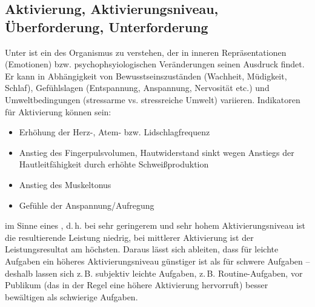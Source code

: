 \subsection{Aktivierung, Aktivierungsniveau, Überforderung, Unterforderung}

\label{topic:ueberforderung-psi}
\label{topic:unterforderung-psi}



Unter  ist ein  des Organismus zu verstehen, der in
inneren Repräsentationen (Emotionen) bzw.
psychophsyiologischen Veränderungen seinen Ausdruck findet.
Er kann in Abhängigkeit von Bewusstseinszuständen (Wachheit,
Müdigkeit, Schlaf), Gefühlslagen (Entspannung, Anspannung,
Nervosität etc.) und Umweltbedingungen (stressarme vs.
stressreiche Umwelt) variieren. Indikatoren für Aktivierung
können sein:
\begin{itemize}
  \item Erhöhung der Herz-, Atem- bzw. Lidschlagfrequenz
  \item Anstieg des Fingerpulsvolumen, Hautwiderstand sinkt 
  wegen Anstiegs der Hautleitfähigkeit durch erhöhte
  Schweißproduktion
  \item Anstieg des Muskeltonus
  \item Gefühle der Anspannung/Aufregung
\end{itemize}


 im Sinne eines , d.\,h. bei sehr
geringerem und sehr hohem Aktivierungsniveau ist die resultierende Leistung niedrig, bei mittlerer
Aktivierung ist der Leistungsresultat am höchsten. 
Daraus
lässt sich ableiten, dass für leichte Aufgaben ein höheres
Aktivierungsniveau günstiger ist als für schwere Aufgaben --
deshalb lassen sich z.\,B. subjektiv leichte Aufgaben,
z.\,B. Routine-Aufgaben, vor Publikum (das in der Regel eine
höhere Aktivierung hervorruft) besser bewältigen als
schwierige Aufgaben.

